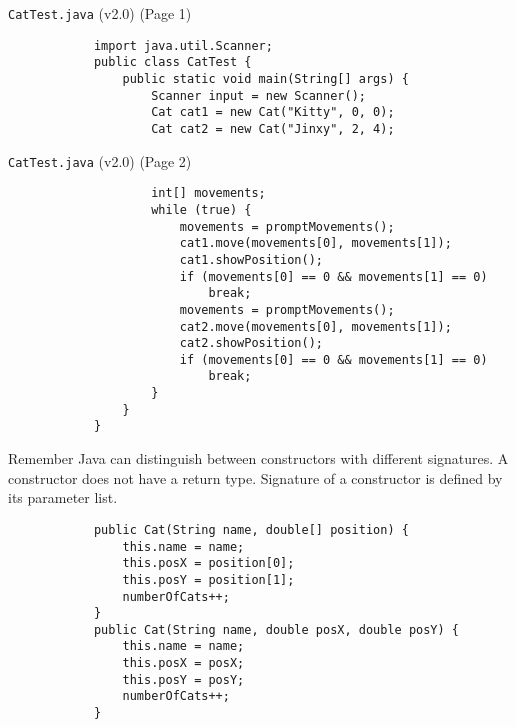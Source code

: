 \documentclass[10pt, compress]{beamer}
\begin{document}
\begin{slide}
	\begin{block}{\texttt{CatTest.java} (v2.0) (Page 1)}
		\begin{verbatim}
			import java.util.Scanner;
			public class CatTest {
			    public static void main(String[] args) {
			        Scanner input = new Scanner();
			        Cat cat1 = new Cat("Kitty", 0, 0);
			        Cat cat2 = new Cat("Jinxy", 2, 4);
		\end{verbatim}
	\end{block}
\end{slide}

\begin{slide}
	\begin{block}{\texttt{CatTest.java} (v2.0) (Page 2)}
		\begin{verbatim}
			        int[] movements;
			        while (true) {
			            movements = promptMovements();
			            cat1.move(movements[0], movements[1]);
			            cat1.showPosition();
			            if (movements[0] == 0 && movements[1] == 0)
			                break;
			            movements = promptMovements();
			            cat2.move(movements[0], movements[1]);
			            cat2.showPosition();
			            if (movements[0] == 0 && movements[1] == 0)
			                break;
			        }
			    }
			}
		\end{verbatim}
	\end{block}
\end{slide}

\begin{slide}
	\begin{block}{Remember}
		Java can distinguish between constructors with different signatures.
		A constructor does not have a return type.
		Signature of a constructor is defined by its parameter list.
		\begin{verbatim}
			public Cat(String name, double[] position) {
			    this.name = name;
			    this.posX = position[0];
			    this.posY = position[1];
			    numberOfCats++;
			}
			public Cat(String name, double posX, double posY) {
			    this.name = name;
			    this.posX = posX;
			    this.posY = posY;
			    numberOfCats++;
			}
		\end{verbatim}
	\end{block}
\end{slide}

\end{document}
